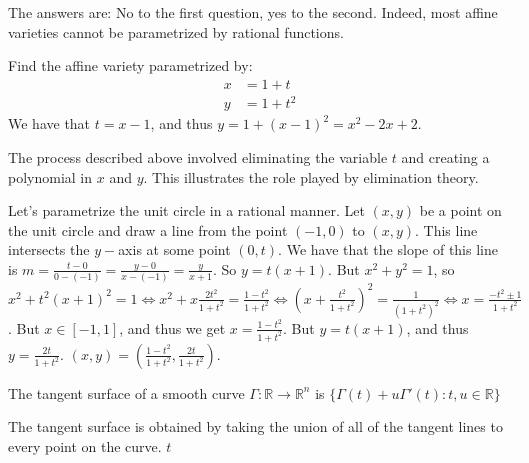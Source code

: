                 The answers are: No to the first question, yes to the
                second. Indeed, most affine varieties cannot be
                parametrized by rational functions.
                \begin{example}
                    Find the affine variety parametrized by:
                    \begin{align*}
                        x&=1+t\\
                        y&=1+t^{2}
                    \end{align*}
                    We have that $t=x-1$, and thus
                    $y=1+(x-1)^{2}=x^{2}-2x+2$.
                \end{example}
                The process described above involved eliminating the
                variable $t$ and creating a polynomial in $x$ and $y$. This
                illustrates the role played by elimination theory.
                \begin{example}
                    Let's parametrize the unit circle in a rational manner.
                    Let $(x,y)$ be a point on the unit circle and draw a
                    line from the point $(-1,0)$ to $(x,y)$. This line
                    intersects the $y-$axis at some point $(0,t)$. We have
                    that the slope of this line is
                    $m=\frac{t-0}{0-(-1)}=\frac{y-0}{x-(-1)}=\frac{y}{x+1}$.
                    So $y=t(x+1)$. But $x^{2}+y^{2}=1$, so
                    $x^2+t^{2}(x+1)^{2}%
                     =1\Leftrightarrow x^{2}+x\frac{2t^{2}}{1+t^{2}}%
                     =\frac{1-t^2}{1+t^2}%
                     \Leftrightarrow(x+\frac{t^{2}}{1+t^{2}})^{2}%
                     =\frac{1}{(1+t^{2})^{2}}%
                     \Leftrightarrow x=\frac{-t^{2}\pm 1}{1+t^{2}}$.
                    But $x\in [-1,1]$, and thus we get
                    $x=\frac{1-t^2}{1+t^2}$. But $y=t(x+1)$, and thus
                    $y=\frac{2t}{1+t^2}$.
                    $(x,y)=(\frac{1-t^{2}}{1+t^{2}},\frac{2t}{1+t^{2}})$.
                \end{example}
                \begin{definition}
                    The tangent surface of a smooth curve
                    $\Gamma:\mathbb{R}\rightarrow\mathbb{R}^n$
                    is $\{\Gamma(t)+u\Gamma'(t):t,u\in \mathbb{R}\}$
                \end{definition}
                The tangent surface is obtained by taking the union of all
                of the tangent lines to every point on the curve. $t$
